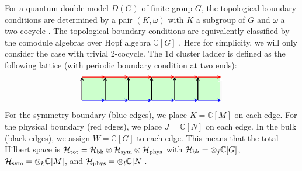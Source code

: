 \documentclass[a4paper,11pt]{article}
\theoremstyle{theorem}
\theoremstyle{remark}
\newcommand{\Cbb}{\mathbb{C}}
\newcommand{\cH}{\text{\usefont{OMS}{cmsy}{m}{n}H}}
\begin{document}
For a quantum double model $D(G)$ of finite group $G$, the topological boundary conditions are determined by a pair $(K,\omega)$ with $K$ a subgroup of $G$ and $\omega$ a two-cocycle \cite{Kitaev2003,Beigi2011the,Cong2017,Bombin2008family}.
The topological boundary conditions are equivalently classified by the comodule algebras over Hopf algebra $\Cbb[G]$ \cite{jia2023boundary,Jia2023weak}. Here for simplicity, we will only consider the case with trivial 2-cocycle.
The 1d cluster ladder is defined as the following lattice (with periodic boundary condition at two ends):
\begin{equation}\label{eq:ClusterLadderG}
\begin{aligned}
\begin{tikzpicture}
    \def\n{5}
    \def\s{1} 
    \fill[green!20] (0, 0) rectangle (\n*\s+\s, \s); %
    \foreach \i in {0,...,\n} {
        \draw[-stealth, line width=1.0pt,blue, midway] (\i*\s, 0) -- (\i*\s+\s, 0);
        \draw[-stealth, line width=1.0pt,red, midway] (\i*\s, \s) -- (\i*\s+\s, \s);
        \draw[-stealth,line width=1.0pt, midway] (\i*\s, 0) -- (\i*\s, \s);
    }
    \draw[-stealth, midway,line width=1.0pt] (\n*\s+\s, 0) -- (\n*\s+\s, \s);
          \draw[-stealth, white, line width=2pt, midway] (6, 0) -- (6, 1.02);
\end{tikzpicture}
\end{aligned}
\end{equation}
For the symmetry boundary (blue edges), we place $K=\Cbb[M]$ on each edge. For the physical boundary (red edges), we place $J=\Cbb[N]$ on each edge. In the bulk (black edges), we assign $W=\Cbb[G]$ to each edge.
This means that the total Hilbert space is $\mathcal{H}_{\rm tot}=\cH_{\rm bk}\otimes \cH_{\rm sym} \otimes \cH_{\rm phys}$ with $\cH_{\rm bk}=\otimes_j \Cbb[G]$, $\cH_{\rm sym} = \otimes_k \Cbb[M]$, and $\cH_{\rm phys}=\otimes_l \Cbb[N]$.
\end{document}
